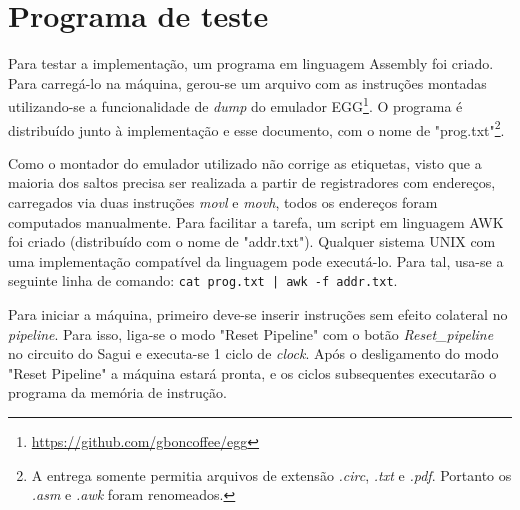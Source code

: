 \documentclass{article}
\begin{document}
\section{Programa de teste}

Para testar a implementação, um programa em linguagem Assembly foi criado. Para
carregá-lo na máquina, gerou-se um arquivo com as instruções montadas
utilizando-se a funcionalidade de \textit{dump} do emulador
EGG\footnote{\url{https://github.com/gboncoffee/egg}}. O programa é distribuído
junto à implementação e esse documento, com o nome de "prog.txt"\footnote{A
entrega somente permitia arquivos de extensão \textit{.circ}, \textit{.txt} e
\textit{.pdf}. Portanto os \textit{.asm} e \textit{.awk} foram renomeados.}.

Como o montador do emulador utilizado não corrige as etiquetas, visto que a
maioria dos saltos precisa ser realizada a partir de registradores com
endereços, carregados via duas instruções \textit{movl} e \textit{movh}, todos
os endereços foram computados manualmente. Para facilitar a tarefa, um script em
linguagem AWK foi criado (distribuído com o nome de "addr.txt"). Qualquer
sistema UNIX com uma implementação compatível da linguagem pode executá-lo. Para
tal, usa-se a seguinte linha de comando: \verb=cat prog.txt | awk -f addr.txt=.

Para iniciar a máquina, primeiro deve-se inserir instruções sem efeito colateral
no \textit{pipeline}. Para isso, liga-se o modo "Reset Pipeline" com o botão
\textit{Reset\_pipeline} no circuito do Sagui e executa-se 1 ciclo de
\textit{clock}. Após o desligamento do modo "Reset Pipeline" a máquina estará
pronta, e os ciclos subsequentes executarão o programa da memória de instrução.
\end{document}

